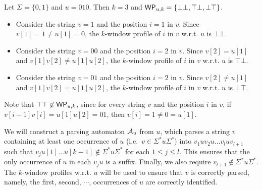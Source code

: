 \begin{example}\label{wprof-exmp}
Let $\Sigma = \{0,1\}$ and $u = 010$. Then $k=3$ and $\mathsf{WP}_{u,k}=\{\bot\bot, \top\bot, \bot\top\}$.
\begin{itemize}
\item Consider the string $v=1$ and the position $i=1$ in $v$. Since $v[1]=1 \neq u[1]=0$, the $k$-window profile of $i$ in $v$ w.r.t. $u$ is $\bot \bot$.
\item Consider the string $v=00$ and the position $i=2$ in $v$. Since $v[2]=u[1]$ and $v[1]v[2] \neq u[1]u[2]$, the $k$-window profile of $i$ in $v$ w.r.t. $u$ is $\top\bot$.
\item Consider the string $v=01$ and the position $i=2$ in $v$. Since $v[2] \neq u[1]$ and $v[1]v[2] = u[1]u[2]$, the $k$-window profile of $i$ in $v$ w.r.t. $u$ is $\bot\top$.
\end{itemize}
Note that $\top\top \not \in \mathsf{WP}_{u,k}$, since for every string $v$ and the position $i$ in $v$, if $v[i-1]v[i]=u[1]u[2]=01$, then $v[i]=1 \neq 0= u[1]$.
\end{example}


We will construct a parsing automaton $\mathcal{A}_u$ from $u$, which parses a string $v$ containing at least one occurrence of $u$ (i.e.\ $v \in \Sigma^\ast u \Sigma^\ast$) into $v_1 u v_2 u \dots v_l u v_{l+1}$ such that $v_j u[1] \dots u[k-1] \not \in \Sigma^\ast u \Sigma^\ast$ for each $1 \le j \le l$.
This ensures that the only occurrence of $u$ in each $v_j u$ is a suffix.
Finally, we also require $v_{l+1} \not \in \Sigma^\ast u \Sigma^\ast$.
The $k$-window profiles w.r.t. $u$ will be used to ensure that $v$ is correctly parsed, namely, the first, second, $\cdots$, occurrences of $u$ are correctly identified.

